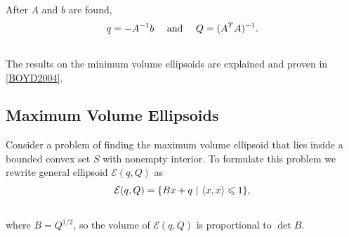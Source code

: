 \documentclass[letterpaper,10pt,english]{sphinxmanual}
\begin{document}
After $A$ and $b$ are found,
\begin{gather}
\begin{split}q=-A^{-1}b ~~~ \mbox{ and } ~~~ Q=(A^TA)^{-1}.\end{split}\notag\\\begin{split}\end{split}\notag
\end{gather}
The results on the minimum volume ellipsoids are explained and proven in
{\hyperref[main_source:boyd2004]{{[}BOYD2004{]}}}.


\subsection{Maximum Volume Ellipsoids}
\label{main_source:maximum-volume-ellipsoids}
Consider a problem of finding the maximum volume ellipsoid that lies
inside a bounded convex set $S$ with nonempty interior. To
formulate this problem we rewrite general ellipsoid
${\mathcal E}(q,Q)$ as
\begin{gather}
\begin{split}{\mathcal E}(q,Q) = \{Bx + q ~|~ \langle x,x\rangle\leqslant1\},\end{split}\notag\\\begin{split}\end{split}\notag
\end{gather}
where $B=Q^{1/2}$, so the volume of ${\mathcal E}(q,Q)$ is
proportional to $\det B$.
\end{document}
